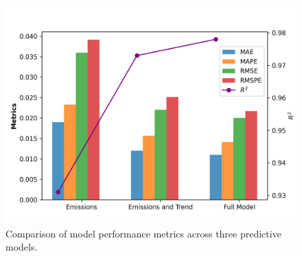 \documentclass[light]{lutbeamer} %
\begin{document}
\begin{frame}
\begin{columns}[T]
        \begin{column}{0.48\textwidth}
            \begin{figure}
                \centering
                \includegraphics[width=\textwidth]{figures/comparison_feature.png}
                \caption{Comparison of model performance metrics across three predictive models.}
            \end{figure}
        \end{column}

    \end{columns}
\end{frame}
\end{document}
